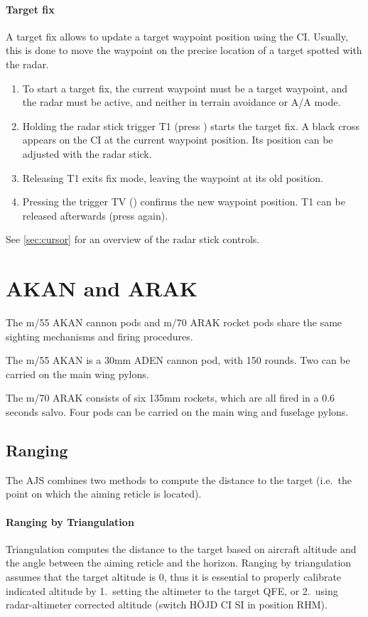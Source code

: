 \paragraph{Target fix}
A target fix allows to update a target waypoint position using the CI.
Usually, this is done to move the waypoint on the precise location of a target spotted with the radar.
\begin{enumerate}
  \item To start a target fix, the current waypoint must be a target waypoint,
    and the radar must be active, and neither in terrain avoidance or A/A mode.
  \item Holding the radar stick trigger T1 (press ) starts the target fix.
    A black cross appears on the CI at the current waypoint position.
    Its position can be adjusted with the radar stick.
  \item Releasing T1 exits fix mode, leaving the waypoint at its old position.
  \item Pressing the trigger TV () confirms the new waypoint position.
    T1 can be released afterwards (press  again).
\end{enumerate}
See \cref{sec:cursor} for an overview of the radar stick controls.


\section{AKAN and ARAK}
The m/55 AKAN cannon pods and m/70 ARAK rocket pods share
the same sighting mechanisms and firing procedures.

The m/55 AKAN is a 30mm ADEN cannon pod, with 150 rounds.
Two can be carried on the main wing pylons.

The m/70 ARAK consists of six 135mm rockets, which are all fired in a 0.6 seconds salvo.
Four pods can be carried on the main wing and fuselage pylons.

\subsection{Ranging}
The AJS combines two methods to compute the distance to the target
(i.e.\ the point on which the aiming reticle is located).

\paragraph{Ranging by Triangulation}
Triangulation computes the distance to the target based on aircraft altitude
and the angle between the aiming reticle and the horizon.
Ranging by triangulation assumes that the target altitude is 0,
thus it is essential to properly calibrate indicated altitude by
1.\ setting the altimeter to the target QFE,
or 2.\ using radar-altimeter corrected altitude (switch HÖJD CI SI in position RHM).


